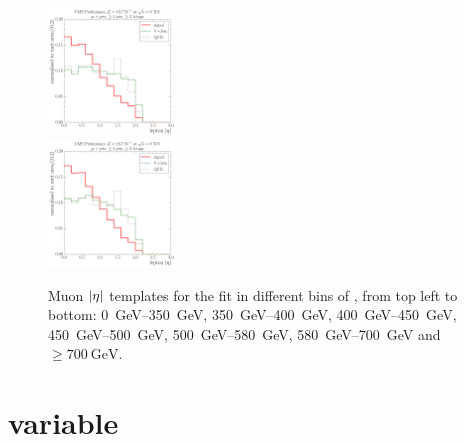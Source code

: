 \begin{figure}[!htbp]
    {\includegraphics[width=0.3\textwidth]{measurement/ST/central/fit_templates/muon_templates_bin_580-700}}\\
    {\includegraphics[width=0.3\textwidth]{measurement/ST/central/fit_templates/muon_templates_bin_700-inf}}
    \caption[Muon $\abs \eta$ templates for the fit in different bins of \ST]{Muon $\abs \eta$ templates for the fit in
    different bins of \ST, from top left to bottom: \SIrange{0}{350}{\GeV}, \SIrange{350}{400}{\GeV},
    \SIrange{400}{450}{\GeV}, \SIrange{450}{500}{\GeV}, \SIrange{500}{580}{\GeV}, \SIrange{580}{700}{\GeV} and $\geq
    \SI{700}{\GeV}$.}
    \label{fig:fit_templates_ST_muon}
\end{figure}

\newpage
\section*{\WPT variable}

